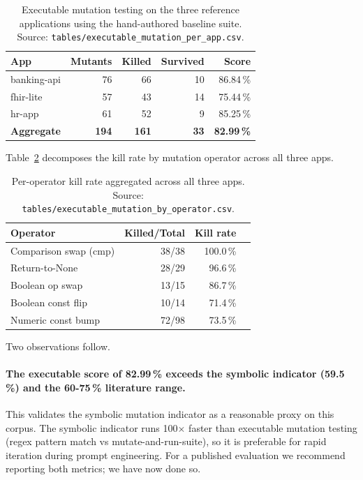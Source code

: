 \documentclass[10pt,twocolumn,letterpaper]{article}
\begin{document}
\begin{table}[H]
\centering
\caption{Executable mutation testing on the three reference
applications using the hand-authored baseline suite.
Source: \texttt{tables/executable\_mutation\_per\_app.csv}.}
\label{tab:exec_mut}
\small
\begin{tabular}{lrrrr}
\toprule
App         & Mutants & Killed & Survived & Score   \\
\midrule
banking-api & 76      & 66     & 10       & 86.84\,\% \\
fhir-lite   & 57      & 43     & 14       & 75.44\,\% \\
hr-app      & 61      & 52     &  9       & 85.25\,\% \\
\midrule
\textbf{Aggregate} & \textbf{194} & \textbf{161} & \textbf{33} & \textbf{82.99\,\%} \\
\bottomrule
\end{tabular}
\end{table}

Table~\ref{tab:exec_op} decomposes the kill rate by mutation
operator across all three apps.

\begin{table}[H]
\centering
\caption{Per-operator kill rate aggregated across all three apps.
Source: \texttt{tables/executable\_mutation\_by\_operator.csv}.}
\label{tab:exec_op}
\small
\begin{tabular}{lrrr}
\toprule
Operator               & Killed/Total & Kill rate \\
\midrule
Comparison swap (cmp)  & 38/38        & 100.0\,\% \\
Return-to-None         & 28/29        & 96.6\,\% \\
Boolean op swap        & 13/15        & 86.7\,\% \\
Boolean const flip     & 10/14        & 71.4\,\% \\
Numeric const bump     & 72/98        & 73.5\,\% \\
\bottomrule
\end{tabular}
\end{table}

Two observations follow.

\paragraph{The executable score of 82.99\,\% exceeds the symbolic
indicator (59.5\,\%) and the 60-75\,\% literature range.}
This validates the symbolic mutation indicator as a reasonable
proxy on this corpus. The symbolic indicator runs 100$\times$
faster than executable mutation testing (regex pattern match vs
mutate-and-run-suite), so it is preferable for rapid iteration
during prompt engineering. For a published evaluation we recommend
reporting both metrics; we have now done so.
\end{document}

